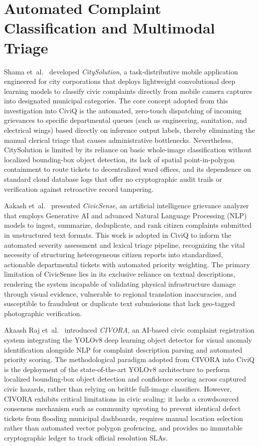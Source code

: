 \documentclass[12pt,a4paper]{report}
\begin{document}
\section{Automated Complaint Classification and Multimodal Triage}

Shama et~al.~\cite{ref_shama2024_citysolution} developed \textit{CitySolution}, a task-distributive mobile application engineered for city corporations that deploys lightweight convolutional deep learning models to classify civic complaints directly from mobile camera captures into designated municipal categories. The core concept adopted from this investigation into CiviQ is the automated, zero-touch dispatching of incoming grievances to specific departmental queues (such as engineering, sanitation, and electrical wings) based directly on inference output labels, thereby eliminating the manual clerical triage that causes administrative bottlenecks. Nevertheless, CitySolution is limited by its reliance on basic whole-image classification without localized bounding-box object detection, its lack of spatial point-in-polygon containment to route tickets to decentralized ward offices, and its dependence on standard cloud database logs that offer no cryptographic audit trails or verification against retroactive record tampering.

Aakash et~al.~\cite{ref_aakash2026_civicsense} presented \textit{CivicSense}, an artificial intelligence grievance analyzer that employs Generative AI and advanced Natural Language Processing (NLP) models to ingest, summarize, deduplicate, and rank citizen complaints submitted in unstructured text formats. This work is adopted in CiviQ to inform the automated severity assessment and lexical triage pipeline, recognizing the vital necessity of structuring heterogeneous citizen reports into standardized, actionable departmental tickets with automated priority weighting. The primary limitation of CivicSense lies in its exclusive reliance on textual descriptions, rendering the system incapable of validating physical infrastructure damage through visual evidence, vulnerable to regional translation inaccuracies, and susceptible to fraudulent or duplicate text submissions that lack geo-tagged photographic verification.

Akaash Raj et~al.~\cite{ref_akaashraj2026_civora} introduced \textit{CIVORA}, an AI-based civic complaint registration system integrating the YOLOv8 deep learning object detector for visual anomaly identification alongside NLP for complaint description parsing and automated priority scoring. The methodological paradigm adopted from CIVORA into CiviQ is the deployment of the state-of-the-art YOLOv8 architecture to perform localized bounding-box object detection and confidence scoring across captured civic hazards, rather than relying on brittle full-image classifiers. However, CIVORA exhibits critical limitations in civic scaling: it lacks a crowdsourced consensus mechanism such as community upvoting to prevent identical defect tickets from flooding municipal dashboards, requires manual location selection rather than automated vector polygon geofencing, and provides no immutable cryptographic ledger to track official resolution SLAs.
\end{document}

